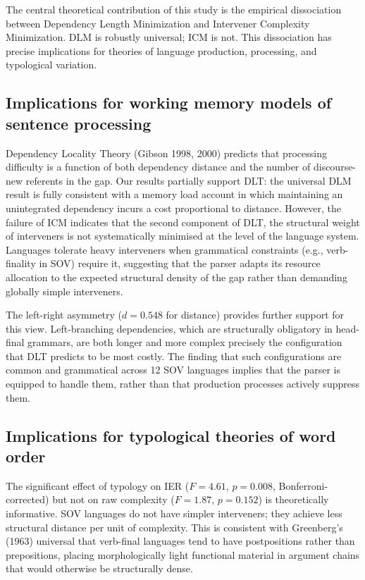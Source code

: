 \documentclass[11pt,a4paper]{article}
\begin{document}
The central theoretical contribution of this study is the empirical dissociation between Dependency Length Minimization and Intervener Complexity Minimization. DLM is robustly universal; ICM is not. This dissociation has precise implications for theories of language production, processing, and typological variation.

\subsection{Implications for working memory models of sentence processing}

Dependency Locality Theory (Gibson 1998, 2000) predicts that processing difficulty is a function of both dependency distance and the number of discourse-new referents in the gap. Our results partially support DLT: the universal DLM result is fully consistent with a memory load account in which maintaining an unintegrated dependency incurs a cost proportional to distance. However, the failure of ICM indicates that the second component of DLT, the structural weight of interveners is not systematically minimised at the level of the language system. Languages tolerate heavy interveners when grammatical constraints (e.g., verb-finality in SOV) require it, suggesting that the parser adapts its resource allocation to the expected structural density of the gap rather than demanding globally simple interveners.

The left-right asymmetry ($d = 0.548$ for distance) provides further support for this view. Left-branching dependencies, which are structurally obligatory in head-final grammars, are both longer and more complex precisely the configuration that DLT predicts to be most costly. The finding that such configurations are common and grammatical across 12 SOV languages implies that the parser is equipped to handle them, rather than that production processes actively suppress them.

\subsection{Implications for typological theories of word order}

The significant effect of typology on IER ($F = 4.61$, $p = 0.008$, Bonferroni-corrected) but not on raw complexity ($F = 1.87$, $p = 0.152$) is theoretically informative. SOV languages do not have simpler interveners; they achieve less structural distance per unit of complexity. This is consistent with Greenberg's (1963) universal that verb-final languages tend to have postpositions rather than prepositions, placing morphologically light functional material in argument chains that would otherwise be structurally dense.
\end{document}
